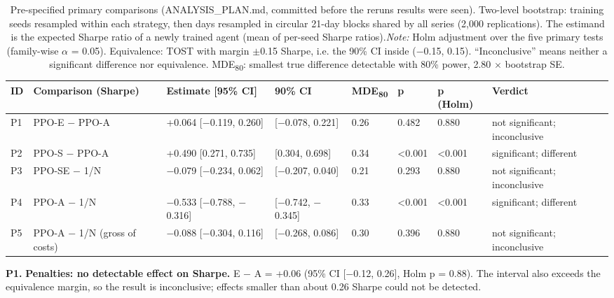 \documentclass[11pt]{article}
\begin{document}
\begin{table}[!htbp]
\centering\scriptsize
\caption{Pre-specified primary comparisons (ANALYSIS\_PLAN.md, committed before the rerun\textquotesingle s results were seen). Two-level bootstrap: training seeds resampled within each strategy, then days resampled in circular 21-day blocks shared by all series (2,000 replications). The estimand is the expected Sharpe ratio of a newly trained agent (mean of per-seed Sharpe ratios).\label{tab-primary-no} \emph{Note:} Holm adjustment over the five primary tests (family-wise $\alpha$ = 0.05). Equivalence: TOST with margin $\pm$0.15 Sharpe, i.e. the 90\% CI inside ($-$0.15, 0.15). ``Inconclusive'' means neither a significant difference nor equivalence. MDE\textsubscript{80}: smallest true difference detectable with 80\% power, 2.80 $\times$ bootstrap SE.}
\begin{adjustbox}{max width=\linewidth}
\begin{tabular}{@{}llllllll@{}}
\toprule
ID & Comparison (Sharpe) & Estimate {[}95\% CI{]} & 90\% CI & MDE\textsubscript{80} & p & p (Holm) & Verdict \\
\midrule
P1 & PPO-E $-$ PPO-A & +0.064 {[}$-$0.119, 0.260{]} & {[}$-$0.078, 0.221{]} & 0.26 & 0.482 & 0.880 & not significant; inconclusive \\
P2 & PPO-S $-$ PPO-A & +0.490 {[}0.271, 0.735{]} & {[}0.304, 0.698{]} & 0.34 & \textless0.001 & \textless0.001 & significant; different \\
P3 & PPO-SE $-$ 1/N & $-$0.079 {[}$-$0.234, 0.062{]} & {[}$-$0.207, 0.040{]} & 0.21 & 0.293 & 0.880 & not significant; inconclusive \\
P4 & PPO-A $-$ 1/N & $-$0.533 {[}$-$0.788, $-$0.316{]} & {[}$-$0.742, $-$0.345{]} & 0.33 & \textless0.001 & \textless0.001 & significant; different \\
P5 & PPO-A $-$ 1/N (gross of costs) & $-$0.088 {[}$-$0.304, 0.116{]} & {[}$-$0.268, 0.086{]} & 0.30 & 0.396 & 0.880 & not significant; inconclusive \\
\bottomrule
\end{tabular}
\end{adjustbox}
\end{table}

\textbf{P1.} \textbf{Penalties: no detectable effect on Sharpe.} E $-$ A = +0.06 (95\% CI {[}$-$0.12, 0.26{]}, Holm p = 0.88). The interval also exceeds the equivalence margin, so the result is inconclusive; effects smaller than about 0.26 Sharpe could not be detected.
\end{document}
